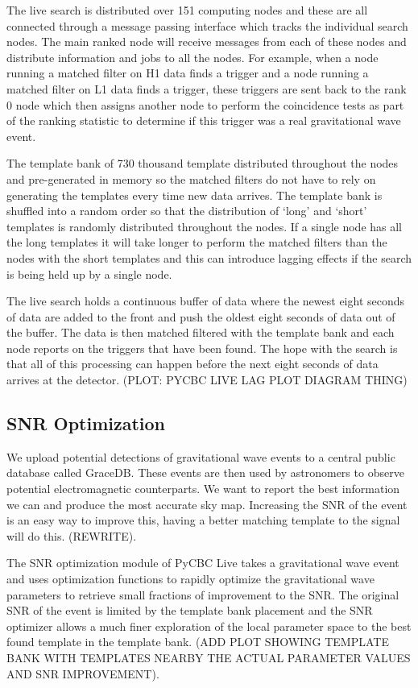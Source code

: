 The live search is distributed over 151 computing nodes and these are all connected through a message passing interface which tracks the individual search nodes. The main ranked node will receive messages from each of these nodes and distribute information and jobs to all the nodes. For example, when a node running a matched filter on H1 data finds a trigger and a node running a matched filter on L1 data finds a trigger, these triggers are sent back to the rank 0 node which then assigns another node to perform the coincidence tests as part of the ranking statistic to determine if this trigger was a real gravitational wave event.

The template bank of 730 thousand template distributed throughout the nodes and pre-generated in memory so the matched filters do not have to rely on generating the templates every time new data arrives. The template bank is shuffled into a random order so that the distribution of `long' and `short' templates is randomly distributed throughout the nodes. If a single node has all the long templates it will take longer to perform the matched filters than the nodes with the short templates and this can introduce lagging effects if the search is being held up by a single node.

The live search holds a continuous buffer of data where the newest eight seconds of data are added to the front and push the oldest eight seconds of data out of the buffer. The data is then matched filtered with the template bank and each node reports on the triggers that have been found. The hope with the search is that all of this processing can happen before the next eight seconds of data arrives at the detector. (PLOT: PYCBC LIVE LAG PLOT DIAGRAM THING)

\subsection{\label{sec:snr-optimization}SNR Optimization}

We upload potential detections of gravitational wave events to a central public database called GraceDB. These events are then used by astronomers to observe potential electromagnetic counterparts. We want to report the best information we can and produce the most accurate sky map. Increasing the SNR of the event is an easy way to improve this, having a better matching template to the signal will do this. (REWRITE).

The SNR optimization module of PyCBC Live takes a gravitational wave event and uses optimization functions to rapidly optimize the gravitational wave parameters to retrieve small fractions of improvement to the SNR. The original SNR of the event is limited by the template bank placement and the SNR optimizer allows a much finer exploration of the local parameter space to the best found template in the template bank. (ADD PLOT SHOWING TEMPLATE BANK WITH TEMPLATES NEARBY THE ACTUAL PARAMETER VALUES AND SNR IMPROVEMENT).

